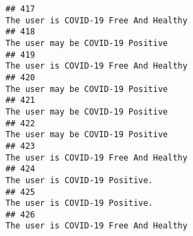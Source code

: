 \documentclass[
]{article}
\begin{document}
\begin{verbatim}
## 417                                                                                                                                                                                                                              The user is COVID-19 Free And Healthy
## 418                                                                                                                                                                                                                                  The user may be COVID-19 Positive
## 419                                                                                                                                                                                                                              The user is COVID-19 Free And Healthy
## 420                                                                                                                                                                                                                                  The user may be COVID-19 Positive
## 421                                                                                                                                                                                                                                  The user may be COVID-19 Positive
## 422                                                                                                                                                                                                                                  The user may be COVID-19 Positive
## 423                                                                                                                                                                                                                              The user is COVID-19 Free And Healthy
## 424                                                                                                                                                                                                                                     The user is COVID-19 Positive.
## 425                                                                                                                                                                                                                                     The user is COVID-19 Positive.
## 426                                                                                                                                                                                                                              The user is COVID-19 Free And Healthy

\end{verbatim}
\end{document}
